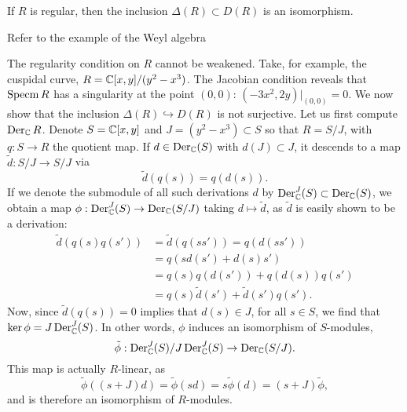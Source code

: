 \begin{theorem}
    If $R$ is regular, then the inclusion $\Delta(R)\subset D(R)$ is an isomorphism.
    \label{thm:derivationiso}
\end{theorem}

Refer to the example of the Weyl algebra %

\begin{example}
    The regularity condition on $R$ cannot be weakened. Take, for example, the cuspidal curve,
    $R=\mathbb{C}[x,y]/(y^2-x^3)$. The Jacobian condition reveals that $\operatorname{Specm} R$ has a
    singularity at the point $(0,0)$: $(-3x^2, 2y)|_{(0,0)}=0$. We now show that the inclusion
    $\Delta(R)\hookrightarrow D(R)$ is not surjective. Let us first compute $\operatorname{Der}_{\mathbb{C}} R$.
    Denote $S=\mathbb{C}[x,y]$ and $J=(y^2-x^3)\subset S$ so that $R=S/J$, with $q:S\to R$ the quotient map.
    If $d\in\operatorname{Der}_{\mathbb{C}}(S)$ with $d(J)\subset J$, it descends to a map $\tilde d:S/J\to S/J$ via
    \[\tilde d(q(s))=q(d(s)).\] If we denote the submodule of all such derivations $d$ by
    $\operatorname{Der}^J_{\mathbb{C}}(S)\subset\operatorname{Der}_{\mathbb{C}}(S)$, we obtain a map $\phi:\operatorname{Der}^J_{\mathbb{C}}(S)\to\operatorname{Der}_{\mathbb{C}}(S/J)$ taking
    $d\mapsto \tilde d$, as $\tilde d$ is easily shown to be a derivation:
    \begin{align*}
        \tilde d(q(s)q(s')) &= \tilde d\left( q(ss') \right)=q(d(ss'))\\
        &= q(sd(s')+d(s)s')\\
        &= q(s)q(d(s')) + q(d(s))q(s')\\
        &= q(s)\tilde d(s') + \tilde d(s')q(s').
    \end{align*}
    Now, since $\tilde d(q(s))=0$ implies that $d(s)\in J$, for all $s\in S$, we find that
    $\ker\phi = J\operatorname{Der}^J_{\mathbb{C}}(S)$. In other words, $\phi$ induces an isomorphism of $S$-modules,
    \[\tilde \phi:\operatorname{Der}^J_{\mathbb{C}}(S)/J\operatorname{Der}_{\mathbb{C}}^J(S)\to\operatorname{Der}_{\mathbb{C}}(S/J).\]
    This map is actually $R$-linear, as 
    \[\tilde\phi( (s+J)d)=\tilde\phi(sd)=s\tilde\phi(d)=(s+J)\tilde\phi,\]
    and is therefore an isomorphism of $R$-modules.


\end{example}

